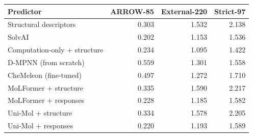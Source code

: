 \begin{tabular}{@{}lrrr@{}}
\toprule
Predictor & ARROW-85 & External-220 & Strict-97 \\
\midrule
Structural descriptors & 0.303 & 1.532 & 2.138 \\
SolvAI & 0.202 & 1.153 & 1.536 \\
Computation-only + structure & 0.234 & 1.095 & 1.422 \\
D-MPNN (from scratch) & 0.559 & 1.301 & 1.558 \\
CheMeleon (fine-tuned) & 0.497 & 1.272 & 1.710 \\
MoLFormer + structure & 0.335 & 1.590 & 2.217 \\
MoLFormer + responses & 0.228 & 1.185 & 1.582 \\
Uni-Mol + structure & 0.334 & 1.578 & 2.205 \\
Uni-Mol + responses & 0.220 & 1.193 & 1.589 \\
\bottomrule
\end{tabular}
